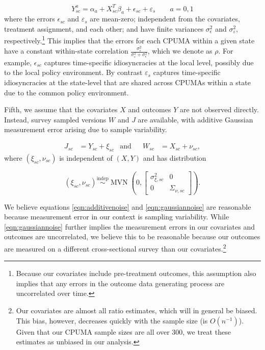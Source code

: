 \documentclass[aoas]{imsart}
\theoremstyle{plain}
\theoremstyle{remark}
\begin{document}
\begin{equation}\label{eqn:linmod}
Y_{sc}^a = \alpha_a + X_{sc}^T\beta_a + \epsilon_{sc} + \varepsilon_s \qquad a = 0, 1
\end{equation}
where the errors $\epsilon_{sc}$ and $\varepsilon_{s}$ are mean-zero; independent from the covariates, treatment assignment, and each other; and have finite variances $\sigma^2_{\epsilon}$ and $\sigma^2_{\varepsilon}$, respectively.\footnote{Because our covariates include pre-treatment outcomes, this assumption also implies that any errors in the outcome data generating process are uncorrelated over time.} This implies that the errors for each CPUMA within a given state have a constant within-state correlation $\frac{\sigma^2_{\varepsilon}}{\sigma^2_{\varepsilon} + \sigma^2_{\epsilon}}$, which we denote as $\rho$. For example, $\epsilon_{sc}$ captures time-specific idiosyncracies at the local level, possibly due to the local policy environment. By contrast $\varepsilon_s$ captures time-specific idiosyncracies at the state-level that are shared across CPUMAs within a state due to the common policy environment.

Fifth, we assume that the covariates $X$ and outcomes $Y$ are not observed directly. Instead, survey sampled versions $W$ and $J$ are available, with additive Gaussian measurement error arising due to sample variability.

\begin{align} \label{eqn:additivenoise}
	J_{sc} & = Y_{sc} + \xi_{sc} & \text{and} & & W_{sc} & = X_{sc} + \nu_{sc},
\end{align}
where $(\xi_{sc}, \nu_{sc})$ is independent of $(X, Y)$ and has distribution

\begin{equation} \label{eqn:gaussiannoise}
 (\xi_{sc}, \nu_{sc}) \stackrel{\text{indep}}{\sim} \operatorname{MVN}\left(0, \left[\begin{array}{cc} \sigma_{\xi,sc}^2 & 0 \\ 0 & \Sigma_{\nu, sc} \end{array}\right] \right).
\end{equation}

We believe equations \eqref{eqn:additivenoise} and \eqref{eqn:gaussiannoise} are reasonable because measurement error in our context is sampling variability. While \eqref{eqn:gaussiannoise} further implies the measurement errors in our covariates and outcomes are uncorrelated, we believe this to be reasonable because our outcomes are measured on a different cross-sectional survey than our covariates.\footnote{Our covariates are almost all ratio estimates, which will in general be biased. This bias, however, decreases quickly with the sample size (is $O(n^{-1})$). Given that our CPUMA sample sizes are all over 300, we treat these estimates as unbiased in our analysis.} 
\end{document}
